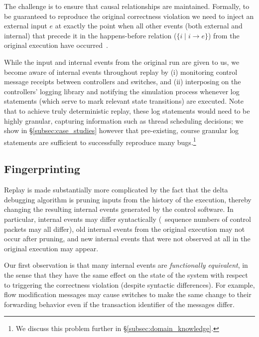 The challenge is to ensure that causal relationships
are maintained. Formally, to be guaranteed to reproduce the original correctness violation
we need to
inject an external input $e$ at exactly the point when all other
events (both external and internal) that precede it in the happens-before
relation ($\{i \mid i \rightarrow e\}$) from the original execution have
occurred~\cite{tel2000introduction}.

While the input and internal events from the original run are given to us,
we become aware of internal events throughout replay by
(i) monitoring
control message receipts between controllers and switches,
and (ii) interposing on the controllers' logging library and notifying the
simulation process whenever log statements (which serve to mark relevant state
transitions) are executed. Note that to achieve truly deterministic
replay, these log statements would need to
be highly granular, capturing information such as thread scheduling decisions;
we show in \S\ref{subsec:case_studies}
however that pre-existing, course granular log statements are sufficient to
successfully reproduce many bugs.\footnote{We discuss this problem further in
\S\ref{subsec:domain_knowledge}.}

\subsection{Fingerprinting}
\label{subsec:fingerprinting}

Replay is made substantially more complicated by the fact
that the delta debugging algorithm is pruning inputs from the history of the
execution, thereby changing the resulting internal events generated by the control
software. In particular, internal events may differ syntactically (\eg~sequence numbers
of control packets may all differ), old internal events from the original
execution may not occur after pruning, and new internal events that were not
observed at all in the original execution may appear.

Our first observation is that many internal events are {\em functionally
equivalent}, in the sense that they
have the same effect on the state of the system with respect to triggering the
correctness violation (despite syntactic differences). For example, flow
modification messages may cause switches to make the same change to their forwarding behavior
even if the transaction identifier of the messages differ.

